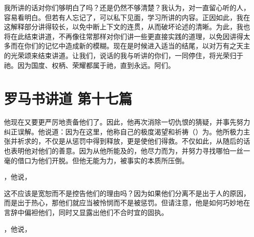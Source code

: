 我所讲的话对你们够明白了吗？还是仍然不够清楚？我认为，对一直留心听的人，容易看明白。但若有人忘记了，可以私下见面，学习所讲的内容。正因如此，我在这解释部分讲得较长，以免中断上下文的连贯，从而破坏论述的清晰。为此，我也将在此结束讲道，不再像往常那样对你们讲一些更直接实践的道理，以免因讲得太多而在你们的记忆中造成新的模糊。现在是时候进入适当的结尾，以对万有之天主的光荣颂来结束讲道。让我们，说话的我与听讲的你们，一同停住，将光荣归于祂。因为国度、权柄、荣耀都属于祂，直到永远。阿们。\par



\section{罗马书讲道 第十七篇}

\par

\par

他现在又要更严厉地责备他们了。因此，他再次消除一切仇恨的猜疑，并事先努力纠正误解。他说道：因为在这里，他称自己的极度渴望和祈祷（）为。他所极力主张并祈求的，不仅是从惩罚中得到释放，更是使他们得救。不仅如此，从随后的话也表明他对他们的善意。因为从他所能及的，他尽力而为，并努力寻找哪怕一丝一毫的借口为他们开脱。但他无能为力，被事实的本质所压倒。\par

 ，他说，\par

这不应该是宽恕而不是控告他们的理由吗？因为如果他们分离不是出于人的原因，而是出于热心，那他们就应当被怜悯而不是被惩罚。但请注意，他是如何巧妙地在言辞中偏袒他们，同时又显露出他们不合时宜的固执。\par

 ，他说，\par

